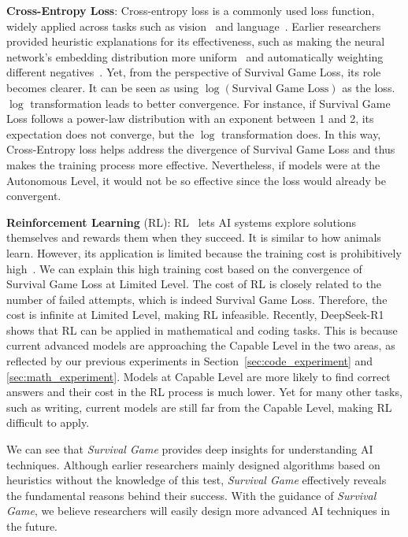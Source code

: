 \textbf{Cross-Entropy Loss}:
Cross-entropy loss is a commonly used loss function, widely applied across tasks such as vision~\citep{oord2018representation, radford2021learning} and language~\citep{radford2019language, izacard2021unsupervised}. Earlier researchers provided heuristic explanations for its effectiveness, such as making the neural network’s embedding distribution more uniform~\citep{wang2020understanding} and automatically weighting different negatives~\citep{chen2020simple}. Yet, from the perspective of Survival Game Loss, its role becomes clearer. It can be seen as using $\log (\text{Survival Game Loss})$ as the loss. $\log$ transformation leads to better convergence. For instance, if Survival Game Loss follows a power-law distribution with an exponent between 1 and 2, its expectation does not converge, but the $\log$ transformation does. In this way, Cross-Entropy loss helps address the divergence of Survival Game Loss and thus makes the training process more effective. Nevertheless, if models were at the Autonomous Level, it would not be so effective since the loss would already be convergent.


\textbf{Reinforcement Learning} (RL):
RL~\citep{kaelbling1996reinforcement} lets AI systems explore solutions themselves and rewards them when they succeed. It is similar to how animals learn. However, its application is limited because the training cost is prohibitively high~\citep{dulac2021challenges}. We can explain this high training cost based on the convergence of Survival Game Loss at Limited Level. The cost of RL is closely related to the number of failed attempts, which is indeed Survival Game Loss. Therefore, the cost is infinite at Limited Level, making RL infeasible. Recently, DeepSeek-R1~\citep{guo2025deepseek} shows that RL can be applied in mathematical and coding tasks. This is because current advanced models are approaching the Capable Level in the two areas, as reflected by our previous experiments in Section~\ref{sec:code_experiment} and \ref{sec:math_experiment}. 
Models at Capable Level are more likely to find correct answers and their cost in the RL process is much lower. Yet for many other tasks, such as writing, current models are still far from the Capable Level, making RL difficult to apply.


We can see that \textit{Survival Game} provides deep insights for understanding AI techniques. Although earlier researchers mainly designed algorithms based on heuristics without the knowledge of this test, \textit{Survival Game} effectively reveals the fundamental reasons behind their success. With the guidance of \textit{Survival Game}, we believe researchers will easily design more advanced AI techniques in the future.


